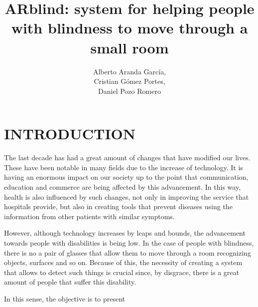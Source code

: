 \documentclass{pre-tfg}
\title{ARblind: system for helping people with blindness to move through a small room}
\author{Alberto Aranda García,\\ \tab[1.6cm] Cristian Gómez Portes, \\ \tab[1.6cm] Daniel Pozo Romero}
\begin{document}
\maketitle
\tableofcontents

\newpage

\section{INTRODUCTION}

The last decade has had a great amount of changes that have modified our lives. These have been notable in many 
fields due to the increase of technology. It is having an enormous impact on our society up to the point that communication, 
education and commerce are being affected by this advancement. In this way, health is also influenced by such changes, 
not only in improving the service that hospitals provide, but also in creating tools that prevent diseases using the information 
from other patients with similar symptoms. 

However, although technology increases by leaps and bounds, the advancement towards people with disabilities is being low. 
In the case of people with blindness, there is no a pair of glasses that allow them to move through a room recognizing objects, 
surfaces and so on. Because of this, the necessity of creating a system that allows to detect such things is crucial since, by disgrace, 
there is a great amount of people that suffer this disability.

In this sense, the objective is to present

\clearpage

%
%
\end{document}
